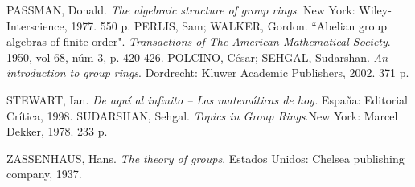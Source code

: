 \begin{thebibliography}{99}
     PASSMAN, Donald. \textit{The algebraic structure of group rings}. New York: Wiley-Interscience, 1977. 550 p.
     PERLIS, Sam; WALKER, Gordon. ``Abelian group algebras of finite order". \textit{Transactions of The American Mathematical Society}. 1950, vol 68, núm 3, p. 420-426.
     POLCINO, César; SEHGAL, Sudarshan. \textit{An introduction to group rings}.  Dordrecht: Kluwer Academic Publishers, 2002. 371 p.
    
     STEWART, Ian. \textit{De aquí al infinito -- Las matemáticas de hoy.} España: Editorial Crítica, 1998.
     SUDARSHAN, Sehgal.  \textit{Topics in Group Rings}.New York: Marcel Dekker, 1978. 233 p. 
    
    
    
	 ZASSENHAUS, Hans. \textit{The theory of groups}. Estados Unidos: Chelsea publishing company, 1937.
	
		
		
\end{thebibliography}
